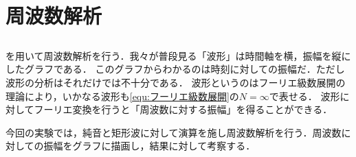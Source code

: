 \chapter{周波数解析}
\section{\kadaiba}\label{sec:\kadaiba}
\purpose
\matlab を用いて周波数解析を行う．我々が普段見る「波形」は時間軸を横，振幅を縦にしたグラフである．
このグラフからわかるのは時刻に対しての振幅だ．ただし波形の分析はそれだけでは不十分である．
波形というのはフーリエ級数展開の理論により，いかなる波形も\eqref{equ:フーリエ級数展開}の\(N=\infty\)で表せる．
波形に対してフーリエ変換を行うと「周波数に対する振幅」を得ることができる．\par
今回の実験では，純音と矩形波に対して演算を施し周波数解析を行う．周波数に対しての振幅をグラフに描画し，結果に対して考察する．
\method

\section{\kadaibb}\label{sec:\kadaibb}